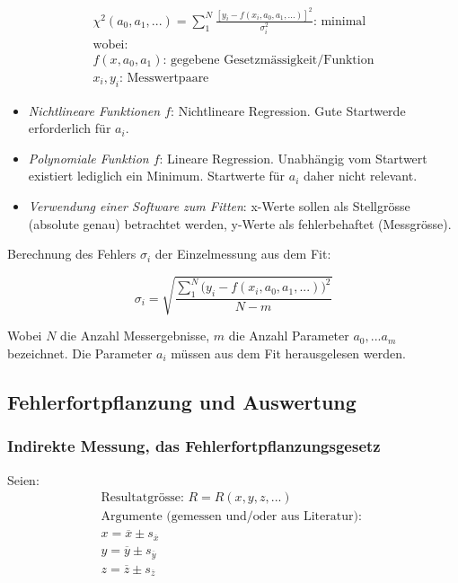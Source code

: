 \begin{gather}
    \chi^2(a_0,a_1,...) = \sum_{1}^{N}{\frac{[y_i - f(x_i,a_0,a_1,...)]^2}{\sigma_i^2}} \text{: minimal}\\
    \text{wobei:} \\
    f(x,a_0,a_1) \text{: gegebene Gesetzm\"assigkeit/Funktion} \\
    x_i,y_i \text{: Messwertpaare}
\end{gather}

\begin{itemize}
    \item
        \emph{Nichtlineare   Funktionen  $f$}: Nichtlineare   Regression. Gute
        Startwerde erforderlich f\"ur $a_i$.
    \item
        \emph{Polynomiale Funktion  $f$}: Lineare Regression. Unabh\"angig vom
        Startwert  existiert  lediglich  ein Minimum. Startwerte  f\"ur  $a_i$
        daher nicht relevant.
    \item
        \emph{Verwendung  einer  Software  zum  Fitten}:  x-Werte  sollen  als
        Stellgr\"osse   (absolute  genau)   betrachtet  werden,   y-Werte  als
        fehlerbehaftet (Messgr\"osse).
\end{itemize}

Berechnung des Fehlers $\sigma_i$ der Einzelmessung aus dem Fit:

\begin{equation}
    \sigma_i = \sqrt{\frac{\sum_1^N{(y_i-f(x_i,a_0,a_1,...)})^2}{N - m}}
\end{equation}

Wobei $N$  die Anzahl  Messergebnisse, $m$  die Anzahl  Parameter $a_0,...a_m$
bezeichnet. Die Parameter $a_i$ m\"ussen aus dem Fit herausgelesen werden.


\subsection{Fehlerfortpflanzung und Auswertung}

\subsubsection{Indirekte Messung, das Fehlerfortpflanzungsgesetz}

Seien:
\begin{gather}
    \text{Resultatgr\"osse: } R = R(x,y,z,...) \\
    \text{Argumente (gemessen und/oder aus Literatur): } \\
    x = \overline{x} \pm s_{\overline{x}} \\
    y = \overline{y} \pm s_{\overline{y}} \\
    z = \overline{z} \pm s_{\overline{z}}
\end{gather}

